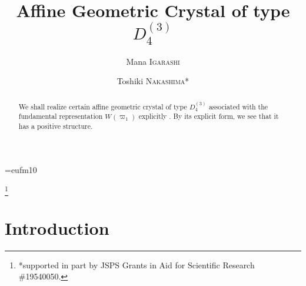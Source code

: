 

\newtheorem{theorem}{Theorem}[section]
\newtheorem{lemma}[theorem]{Lemma}

\theoremstyle{definition}
\newtheorem{definition}[theorem]{Definition}
\newtheorem{example}[theorem]{Example}
\newtheorem{xca}[theorem]{Exercise}

\theoremstyle{remark}
\newtheorem{remark}[theorem]{Remark}


\usepackage{graphicx,amsthm}
\usepackage{verbatim,amsmath,amscd,amssymb}



\font\germ=eufm10

\def\W1{W(\varpi_1)}

\newtheorem{thm}{Theorem}[section]
\newtheorem{pro}[thm]{Proposition}
\newtheorem{lem}[thm]{Lemma}
\newtheorem{ex}[thm]{Example}
\newtheorem{cor}[thm]{Corollary}
\newtheorem{conj}[thm]{Conjecture}
\theoremstyle{definition}
\newtheorem{df}[thm]{Definition}

\title{Affine Geometric Crystal of type ${D^{(3)}_{4}}$}

\author[M.Igarashi]{Mana I\textsc{garashi}}
\author[T.Nakashima]{Toshiki N\textsc{akashima}*}
\address{Department of Mathematics, 
Sophia University, Kioicho 7-1, Chiyoda-ku, Tokyo 102-8554,
Japan}
\address{Department of Mathematics, 
Sophia University, Kioicho 7-1, Chiyoda-ku, Tokyo 102-8554,
Japan}
\thanks{*supported in part by JSPS Grants 
in Aid for Scientific Research \#19540050.}
\date{}


\begin{abstract}
We shall realize certain affine geometric 
crystal of type ${D^{(3)}_{4}}$ 
associated with the fundamental 
representation $W(\varpi_1)$ explicitly . 
By its explicit form, we see that it 
has a positive structure.
\end{abstract}

\maketitle

\section{Introduction}
\setcounter{equation}{0}

